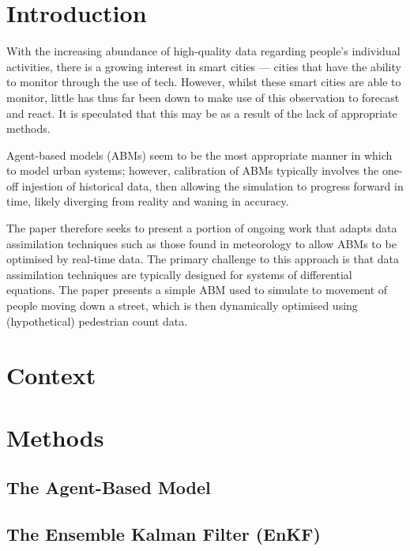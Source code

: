 \section{Introduction}
\label{malleson:intro}

With the increasing abundance of high-quality data regarding people's individual activities, there is a growing interest in smart cities --- cities that have the ability to monitor through the use of tech.
However, whilst these smart cities are able to monitor, little has thus far been down to make use of this observation to forecast and react.
It is speculated that this may be as a result of the lack of appropriate methods.

Agent-based models (ABMs) seem to be the most appropriate manner in which to model urban systems; however, calibration of ABMs typically involves the one-off injestion of historical data, then allowing the simulation to progress forward in time, likely diverging from reality and waning in accuracy.

The paper therefore seeks to present a portion of ongoing work that adapts data assimilation techniques such as those found in meteorology to allow ABMs to be optimised by real-time data.
The primary challenge to this approach is that data assimilation techniques are typically designed for systems of differential equations.
The paper presents a simple ABM used to simulate to movement of people moving down a street, which is then dynamically optimised using (hypothetical) pedestrian count data.

\section{Context}
\label{malleson:context}

\section{Methods}
\label{malleson:methods}

\subsection{The Agent-Based Model}
\label{malleson:methods:abm}

\subsection{The Ensemble Kalman Filter (EnKF)}
\label{malleson:methods:enkf}

